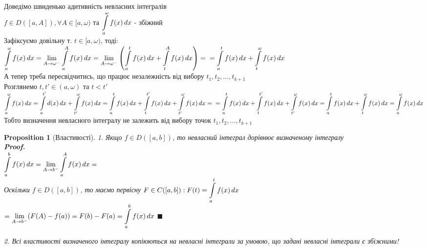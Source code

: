 \documentclass[a4paper, 14pt]{extarticle}
\def\huge{\displaystyle}
\theoremstyle{theoremdd}
\theoremstyle{theoremdd}
\theoremstyle{theoremdd}
\theoremstyle{theoremdd}
\theoremstyle{theoremdd}
\newtheorem{proposition}[theorem]{Proposition}
\theoremstyle{theoremdd}
\theoremstyle{theoremdd}
\theoremstyle{theoremdd}
\newenvironment{pfNoTh}{\textbf{Proof. \\}}{$\blacksquare$}
\begin{document}
Доведімо швиденько адитивність невласних інтегралів\\
$f \in D([a,A]), \forall A \in [a,\omega)$ та $\huge \int\displaylimits_a^\omega f(x)\,dx$ - збіжний\\
Зафіксуємо довільну т. $t \in [a,\omega)$, тоді:\\
$\huge \int\displaylimits_a^\omega f(x)\,dx = \huge \lim_{A \to \omega^-} \int\displaylimits_a^A f(x)\,dx = \lim_{A \to \omega^-} \left(\int\displaylimits_a^t f(x)\,dx + \int\displaylimits_t^A f(x)\,dx \right) = \\ = \int\displaylimits_a^t f(x)\,dx + \int\displaylimits_t^\omega f(x)\,dx$\\
А тепер треба пересвідчитись, що працює незалежність від вибору $t_1,t_2,\dots,t_{k+1}$\\
Розглянемо $t,t' \in (a,\omega)$ та $t < t'$\\
$\huge\int\displaylimits_a^\omega f(x)\,dx = \int\displaylimits_a^{t'} d(x)\,dx + \int\displaylimits_{t'}^{\omega} f(x)\,dx = \int\displaylimits_a^{t} f(x)\,dx + \int\displaylimits_{t}^{t'} f(x)\,dx + \int\displaylimits_{t'}^{\omega} f(x)\,dx = \\
= \int\displaylimits_{a}^{t} f(x)\,dx + \int\displaylimits_{t}^{t'} f(x)\,dx + \int\displaylimits_{t'}^{\omega} f(x)\,dx = \int\displaylimits_{a}^{t} f(x)\,dx + \int\displaylimits_{t}^{\omega} f(x)\,dx = \huge\int\displaylimits_a^\omega f(x)\,dx$\\
Тобто визначення невласного інтегралу не залежить від вибору точок $t_1,t_2,\dots,t_{k+1}$

\begin{proposition}[Властивості]
1. Якщо $f \in D([a,b])$, то невласний інтеграл дорівнює визначеному інтегралу\\
\begin{pfNoTh}
$\huge\int\displaylimits_a^b f(x)\,dx = \huge \lim_{A \to b^-} \int\displaylimits_a^A f(x)\,dx = $\\
Оскільки $f \in D([a,b])$, то маємо первісну $F \in C([a,b]): F(t) = \huge\int\displaylimits_a^t f(x)\,dx$\\
$= \huge \lim_{A \to b^-} (F(A)-f(a)) = F(b) - F(a) = \huge\int\displaylimits_a^b f(x)\,dx$
\end{pfNoTh}

2. Всі властивості визначеного інтегралу копіюються на невласні інтеграли за умовою, що задані невласні інтеграли є збіжними!
\end{proposition}
\end{document}
